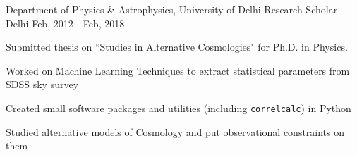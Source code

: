 

\begin{cventries}
	
	\cventry
	{Department of Physics \& Astrophysics, University of Delhi} %
	{Research Scholar} %
	{Delhi} %
	{Feb, 2012 - Feb, 2018} %
	{
		\begin{cvitems} 
			\item {Submitted thesis on ``Studies in Alternative Cosmologies" for Ph.D. in Physics.}
			\item {Worked on Machine Learning Techniques to extract statistical parameters from SDSS sky survey}
			\item {Created small software packages and utilities (including \texttt{correlcalc}) in Python}
			\item {Studied alternative models of Cosmology and put observational constraints on them}
		\end{cvitems}
	}
	
\end{cventries}

